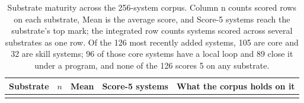 \documentclass[
  11pt,
]{article}
\newcounter{none} %
\begin{document}
\begin{table}[htbp]
\caption{Substrate maturity across the 256-system corpus. Column n counts scored rows on each substrate, Mean is the average score, and Score-5 systems reach the substrate's top mark; the integrated row counts systems scored across several substrates as one row. Of the 126 most recently added systems, 105 are core and 32 are skill systems; 96 of those core systems have a local loop and 89 close it under a program, and none of the 126 scores 5 on any substrate.}\label{tab:V-2}
\centering\small
\begin{tabular}{@{}
  >{\raggedright\arraybackslash}p{}
  >{\raggedleft\arraybackslash}p{}
  >{\raggedleft\arraybackslash}p{}
  >{\raggedright\arraybackslash}p{}
  >{\raggedright\arraybackslash}p{}@{}}
\toprule\noalign{}
\begin{minipage}[b]{\linewidth}\raggedright
Substrate
\end{minipage} & \begin{minipage}[b]{\linewidth}\raggedleft
\(n\)
\end{minipage} & \begin{minipage}[b]{\linewidth}\raggedleft
Mean
\end{minipage} & \begin{minipage}[b]{\linewidth}\raggedright
Score-5 systems
\end{minipage} & \begin{minipage}[b]{\linewidth}\raggedright
What the corpus holds on it
\end{minipage} \\
\midrule\noalign{}



\end{tabular}
\end{table}
\end{document}
